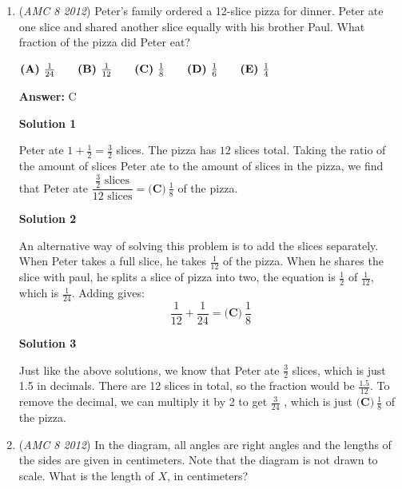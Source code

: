\begin{enumerate}
	\item (\textit{AMC 8 2012}) Peter's family ordered a 12-slice pizza for dinner. Peter ate one slice and shared another slice equally with his brother Paul. What fraction of the pizza did Peter eat?


 $\textbf{(A)}\hspace{.05in}\frac{1}{24}\qquad\textbf{(B)}\hspace{.05in}\frac{1}{12}\qquad\textbf{(C)}\hspace{.05in}\frac{1}{8}\qquad\textbf{(D)}\hspace{.05in}\frac{1}{6}\qquad\textbf{(E)}\hspace{.05in}\frac{1}{4}$

 \textbf{Answer: }C



\textbf{Solution 1}

Peter ate $1 + \frac{1}{2} = \frac{3}{2}$ slices. The pizza has $12$ slices total. Taking the ratio of the amount of slices Peter ate to the amount of slices in the pizza, we find that Peter ate $\dfrac{\frac{3}{2}\text{ slices}}{12\text{ slices}} = \boxed{\textbf{(C)}\ \frac{1}{8}}$ of the pizza.

 



\textbf{Solution 2}

An alternative way of solving this problem is to add the slices separately. When Peter takes a full slice, he takes $\frac{1}{12}$ of the pizza. When he shares the slice with paul, he splits a slice of pizza into two, the equation is $\frac{1}{2}$ of $\frac{1}{12}$, which is $\frac{1}{24}$. Adding gives: 
 \[\frac{1}{12}+\frac{1}{24}=\boxed{\textbf{(C)}~\frac{1}{8}}\]




\textbf{Solution 3}

Just like the above solutions, we know that Peter ate $\frac{3}{2}$ slices, which is just 1.5 in decimals. There are 12 slices in total, so the fraction would be $\frac{1.5}{12}$. To remove the decimal, we can multiply it by 2 to get $\frac{3}{24}$ , which is just $\boxed{\textbf{(C)}\ \frac{1}{8}}$ of the pizza.

 


	\item (\textit{AMC 8 2012}) In the diagram, all angles are right angles and the lengths of the sides are given in centimeters. Note that the diagram is not drawn to scale. What is the length of $X$,  in centimeters?



\end{enumerate}
